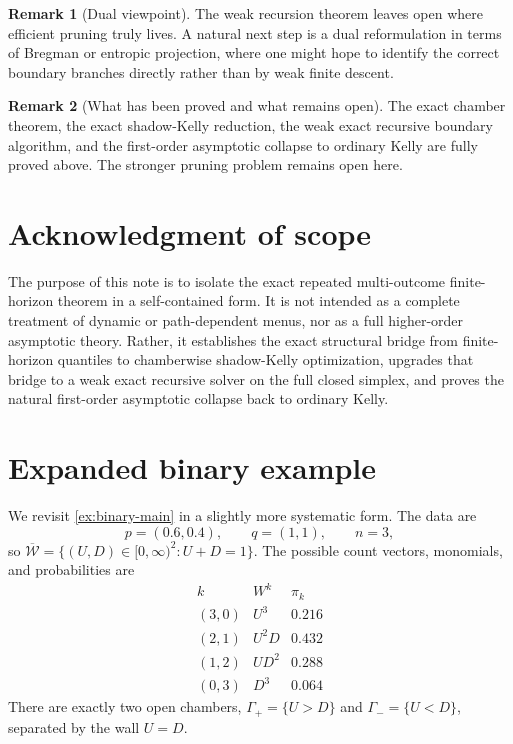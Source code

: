 \documentclass[11pt]{article}
\theoremstyle{definition}
\newtheorem{remark}[remark]{Remark}
\newcommand{\1}{\mathbf{1}}
\begin{document}
\begin{remark}[Dual viewpoint]
The weak recursion theorem leaves open where efficient pruning truly lives. A natural next step is a dual reformulation in terms of Bregman or entropic projection, where one might hope to identify the correct boundary branches directly rather than by weak finite descent.
\end{remark}

\begin{remark}[What has been proved and what remains open]
The exact chamber theorem, the exact shadow-Kelly reduction, the weak exact recursive boundary algorithm, and the first-order asymptotic collapse to ordinary Kelly are fully proved above. The stronger pruning problem remains open here.
\end{remark}

\section*{Acknowledgment of scope}
The purpose of this note is to isolate the exact repeated multi-outcome finite-horizon theorem in a self-contained form. It is not intended as a complete treatment of dynamic or path-dependent menus, nor as a full higher-order asymptotic theory. Rather, it establishes the exact structural bridge from finite-horizon quantiles to chamberwise shadow-Kelly optimization, upgrades that bridge to a weak exact recursive solver on the full closed simplex, and proves the natural first-order asymptotic collapse back to ordinary Kelly.


\appendix

\section{Expanded binary example}\label{app:binary-example}
We revisit \cref{ex:binary-main} in a slightly more systematic form. The data are
\[
p=(0.6,0.4),\qquad q=(1,1),\qquad n=3,
\]
so $\overline{\mathcal W}=\{(U,D)\in[0,\infty)^2:U+D=1\}$. The possible count vectors, monomials, and probabilities are
\[
\begin{array}{c|c|c}
k & W^k & \pi_k \\ \hline
(3,0) & U^3 & 0.216 \\
(2,1) & U^2D & 0.432 \\
(1,2) & UD^2 & 0.288 \\
(0,3) & D^3 & 0.064
\end{array}
\]
There are exactly two open chambers, $\Gamma_+=\{U>D\}$ and $\Gamma_-=\{U<D\}$, separated by the wall $U=D$.
\end{document}

